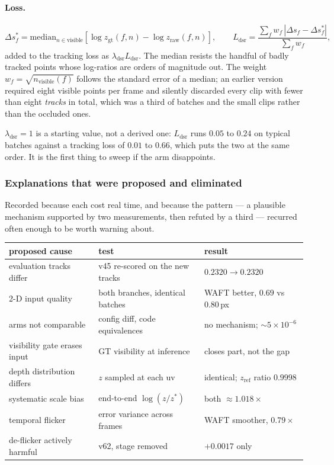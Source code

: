 \documentclass[11pt,a4paper]{article}
\begin{document}
\paragraph{Loss.}
\[
  \Delta s^{*}_f = \mathrm{median}_{n \in \text{visible}}\!\left[\log z_{\text{gt}}(f,n) - \log
  z_{\text{raw}}(f,n)\right], \qquad
  L_{\text{dsr}} = \frac{\sum_f w_f\,|\Delta s_f - \Delta s^{*}_f|}{\sum_f w_f},
\]
added to the tracking loss as $\lambda_{\text{dsr}} L_{\text{dsr}}$. The median resists the handful
of badly tracked points whose log-ratios are orders of magnitude out. The weight $w_f =
\sqrt{n_{\text{visible}}(f)}$ follows the standard error of a median; an earlier version required
eight visible points per frame and silently discarded every clip with fewer than eight
\emph{tracks} in total, which was a third of batches and the small clips rather than the occluded
ones.

$\lambda_{\text{dsr}} = 1$ is a starting value, not a derived one: $L_{\text{dsr}}$ runs $0.05$ to
$0.24$ on typical batches against a tracking loss of $0.01$ to $0.66$, which puts the two at the
same order.
It is the first thing to sweep if the arm disappoints.

\subsubsection{Explanations that were proposed and eliminated}
\label{sec:waft-eliminated}

Recorded because each cost real time, and because the pattern --- a plausible mechanism supported by
two measurements, then refuted by a third --- recurred often enough to be worth warning about.

\begin{center}
\begin{tabular}{lll}
\toprule
proposed cause & test & result \\
\midrule
evaluation tracks differ    & v45 re-scored on the new tracks & $0.2320\to0.2320$ \\
2-D input quality           & both branches, identical batches & WAFT better, $0.69$ vs $0.80$\,px \\
arms not comparable         & config diff, code equivalences   & no mechanism; $\sim$$5\times10^{-6}$ \\
visibility gate erases input& GT visibility at inference       & closes part, not the gap \\
depth distribution differs  & $z$ sampled at each uv           & identical; $z_{\mathrm{ref}}$ ratio $0.9998$ \\
systematic scale bias       & end-to-end $\log(z/z^{*})$       & both $\approx1.018\times$ \\
temporal flicker            & error variance across frames     & WAFT smoother, $0.79\times$ \\
de-flicker actively harmful & v62, stage removed               & $+0.0017$ only \\
\bottomrule
\end{tabular}
\end{center}
\end{document}
